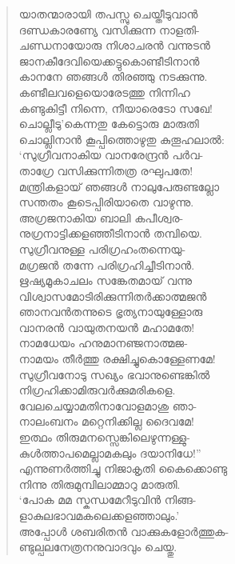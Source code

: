 \begin{verse}
യാതന്മാരായി തപസ്സു ചെയ്തീടുവാന്‍\\
ദണ്ഡകാരണ്യേ വസിക്കുന്ന നാളതി-\\
ചണ്ഡനായോരു നിശാചരന്‍ വന്നുടന്‍\\
ജാനകീദേവിയെക്കട്ടുകൊണ്ടീടിനാന്‍\\
കാനനേ ഞങ്ങള്‍ തിരഞ്ഞു നടക്കുന്നു.\\
കണ്ടീലവളെയൊരേടത്തു നിന്നിഹ\\
കണ്ടുകിട്ടീ നിന്നെ, നീയാരെടോ സഖേ!\\
ചൊല്ലീടു’കെന്നതു കേട്ടൊരു മാരുതി\\
ചൊല്ലിനാന്‍ കൂപ്പിത്തൊഴുതു കുതൂഹലാല്‍:\\
‘സുഗ്രീവനാകിയ വാനരേന്ദ്രന്‍ പര്‍വ-\\
താഗ്രേ വസിക്കുന്നിതത്ര രഘുപതേ!\\
മന്ത്രികളായ് ഞങ്ങള്‍ നാലുപേരുണ്ടല്ലോ\\
സന്തതം കൂടെപ്പിരിയാതെ വാഴുന്നു.\\
അഗ്രജനാകിയ ബാലി കപീശ്വര-\\
നുഗ്രനാട്ടിക്കളഞ്ഞീടിനാന്‍ തമ്പിയെ.\\
സുഗ്രീവനുള്ള പരിഗ്രഹംതന്നെയു-\\
മഗ്രജന്‍ തന്നേ പരിഗ്രഹിച്ചീടിനാന്‍.\\
ഋഷ്യമൂകാചലം സങ്കേതമായ് വന്നു\\
വിശ്വാസമോടിരിക്കുന്നിതര്‍ക്കാത്മജന്‍\\
ഞാനവന്‍തന്നുടെ ഭൃത്യനായുള്ളോരു\\
വാനരന്‍ വായുതനയന്‍ മഹാമതേ!\\
നാമധേയം ഹനുമാനഞ്ജനാത്മജ-\\
നാമയം തീര്‍ത്തു രക്ഷിച്ചുകൊള്ളേണമേ!\\
സുഗ്രീവനോടു സഖ്യം ഭവാനുണ്ടെങ്കില്‍\\
നിഗ്രഹിക്കാമിരുവര്‍ക്കുമരികളെ.\\
വേലചെയ്യാമതിനാവോളമാശു ഞാ-\\
നാലംബനം മറ്റെനിക്കില്ല ദൈവമേ!\\
ഇത്ഥം തിരുമനസ്സെങ്കിലെഴുന്നള്ളു-\\
കുള്‍ത്താപമെല്ലാമകലും ദയാനിധേ!”\\
എന്നുണര്‍ത്തിച്ചു നിജാകൃതി കൈക്കൊണ്ടു\\
നിന്നു തിരുമുമ്പിലാമ്മാറു മാരുതി.\\
‘പോക മമ സ്കന്ധമേറീടുവിന്‍ നിങ്ങ-\\
ളാകുലഭാവമകലെക്കളഞ്ഞാലും.’\\
അപ്പോള്‍ ശബരിതന്‍ വാക്കുകളോര്‍ത്തുക-\\
ണ്ടുല്പലനേത്രനനുവാദവും ചെയ്തു.
\end{verse}


